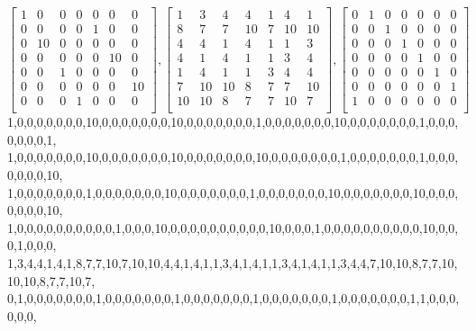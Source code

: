 $$
\left[
\begin{array}{*{7}{r}}
1 & 0 & 0 & 0 & 0 & 0 & 0\\
0 & 0 & 0 & 0 & 1 & 0 & 0\\
0 & 10 & 0 & 0 & 0 & 0 & 0\\
0 & 0 & 0 & 0 & 0 & 10 & 0\\
0 & 0 & 1 & 0 & 0 & 0 & 0\\
0 & 0 & 0 & 0 & 0 & 0 & 10\\
0 & 0 & 0 & 1 & 0 & 0 & 0\\
\end{array}
\right]
, 
\left[
\begin{array}{*{7}{r}}
1 & 3 & 4 & 4 & 1 & 4 & 1\\
8 & 7 & 7 & 10 & 7 & 10 & 10\\
4 & 4 & 1 & 4 & 1 & 1 & 3\\
4 & 1 & 4 & 1 & 1 & 3 & 4\\
1 & 4 & 1 & 1 & 3 & 4 & 4\\
7 & 10 & 10 & 8 & 7 & 7 & 10\\
10 & 10 & 8 & 7 & 7 & 10 & 7\\
\end{array}
\right]
, 
\left[
\begin{array}{*{7}{r}}
0 & 1 & 0 & 0 & 0 & 0 & 0\\
0 & 0 & 1 & 0 & 0 & 0 & 0\\
0 & 0 & 0 & 1 & 0 & 0 & 0\\
0 & 0 & 0 & 0 & 1 & 0 & 0\\
0 & 0 & 0 & 0 & 0 & 1 & 0\\
0 & 0 & 0 & 0 & 0 & 0 & 1\\
1 & 0 & 0 & 0 & 0 & 0 & 0\\
\end{array}
\right]
$$
1,0,0,0,0,0,0,0,10,0,0,0,0,0,0,0,10,0,0,0,0,0,0,0,1,0,0,0,0,0,0,0,10,0,0,0,0,0,0,0,1,0,0,0,0,0,0,0,1,\\
1,0,0,0,0,0,0,0,10,0,0,0,0,0,0,0,10,0,0,0,0,0,0,0,10,0,0,0,0,0,0,0,1,0,0,0,0,0,0,0,1,0,0,0,0,0,0,0,10,\\
1,0,0,0,0,0,0,0,1,0,0,0,0,0,0,0,10,0,0,0,0,0,0,0,1,0,0,0,0,0,0,0,10,0,0,0,0,0,0,0,10,0,0,0,0,0,0,0,10,\\
1,0,0,0,0,0,0,0,0,0,0,1,0,0,0,10,0,0,0,0,0,0,0,0,0,0,10,0,0,0,1,0,0,0,0,0,0,0,0,0,0,10,0,0,0,1,0,0,0,\\
1,3,4,4,1,4,1,8,7,7,10,7,10,10,4,4,1,4,1,1,3,4,1,4,1,1,3,4,1,4,1,1,3,4,4,7,10,10,8,7,7,10,10,10,8,7,7,10,7,\\
0,1,0,0,0,0,0,0,0,1,0,0,0,0,0,0,0,1,0,0,0,0,0,0,0,1,0,0,0,0,0,0,0,1,0,0,0,0,0,0,0,1,1,0,0,0,0,0,0,\\
